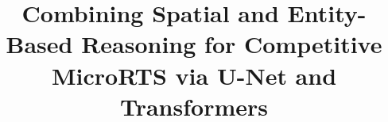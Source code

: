 \documentclass[conference]{IEEEtran}
\newif\ifanonymous
\newcommand{\code}[1]{{\ttfamily\hyphenchar\font=45\relax #1}}
\begin{document}
\title{Combining Spatial and Entity-Based Reasoning for Competitive MicroRTS via U-Net and Transformers}

\ifanonymous
    \author{%
        \IEEEauthorblockN{Anonymous Authors}
        \IEEEauthorblockA{
        Anonymous Institution\\
        Anonymous City, Country
        }
        \and
        \IEEEauthorblockN{Anonymous Authors}
        \IEEEauthorblockA{
        Anonymous Institution\\
        Anonymous City, Country
        }
        \and
        \IEEEauthorblockN{Anonymous Authors}
        \IEEEauthorblockA{
        Anonymous Institution\\
        Anonymous City, Country
        }
    }
\else
    \author{%
      \and
      \and
    }
\fi

\maketitle

\end{document}
